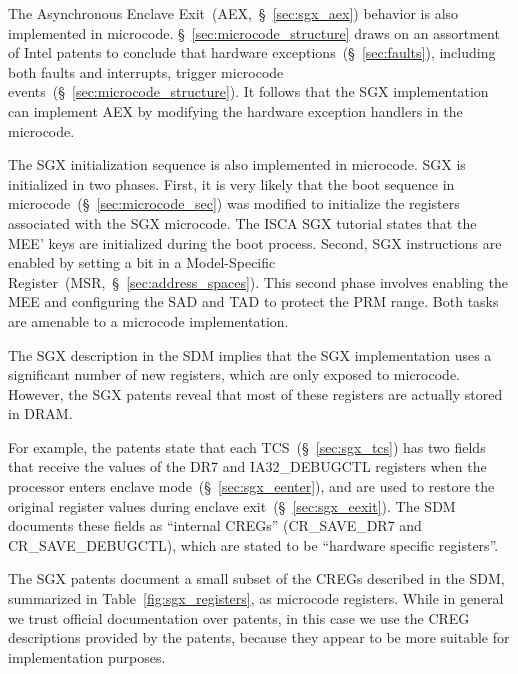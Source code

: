 The Asynchronous Enclave Exit~(AEX,~\S~\ref{sec:sgx_aex}) behavior is also
implemented in microcode. \S~\ref{sec:microcode_structure} draws on an
assortment of Intel patents to conclude that hardware
exceptions~(\S~\ref{sec:faults}), including both faults and interrupts,
trigger microcode events~(\S~\ref{sec:microcode_structure}). It follows that
the SGX implementation can implement AEX by modifying the hardware exception
handlers in the microcode.


The SGX initialization sequence is also implemented in microcode. SGX is
initialized in two phases. First, it is very likely that the boot sequence in
microcode~(\S~\ref{sec:microcode_sec}) was modified to initialize the registers
associated with the SGX microcode. The ISCA SGX tutorial states that the MEE'
keys are initialized during the boot process. Second, SGX instructions are
enabled by setting a bit in a Model-Specific
Register~(MSR,~\S~\ref{sec:address_spaces}). This second phase involves
enabling the MEE and configuring the SAD and TAD to protect the PRM range. Both
tasks are amenable to a microcode implementation.

The SGX description in the SDM implies that the SGX implementation uses a
significant number of new registers, which are only exposed to microcode.
However, the SGX patents reveal that most of these registers are actually
stored in DRAM.


For example, the patents state that each TCS~(\S~\ref{sec:sgx_tcs}) has two
fields that receive the values of the DR7 and IA32\_DEBUGCTL registers when the
processor enters enclave mode~(\S~\ref{sec:sgx_eenter}), and are used to
restore the original register values during enclave
exit~(\S~\ref{sec:sgx_eexit}). The SDM documents these fields as ``internal
CREGs'' (CR\_SAVE\_DR7 and CR\_SAVE\_DEBUGCTL), which are stated to be
``hardware specific registers''.


The SGX patents document a small subset of the CREGs described in the SDM,
summarized in Table~\ref{fig:sgx_registers}, as microcode registers. While in
general we trust official documentation over patents, in this case we use the
CREG descriptions provided by the patents, because they appear to be more
suitable for implementation purposes.

